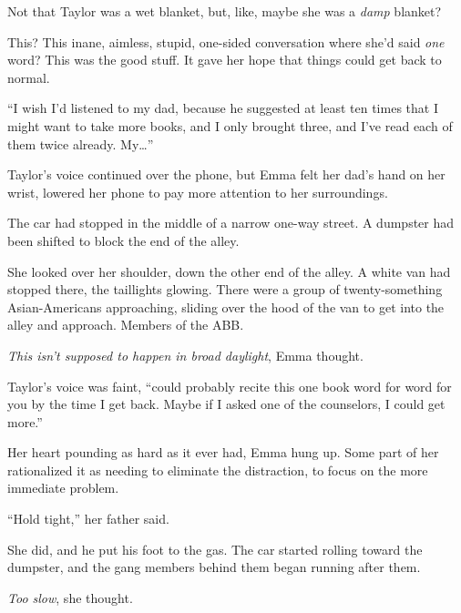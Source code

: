 Not that Taylor was a wet blanket, but, like, maybe she was a \emph{damp} blanket?



This?  This inane, aimless, stupid, one-sided conversation where she'd said\emph{ one} word?  This was the good stuff.  It gave her hope that things could get back to normal.



``\ldotsand I wish I'd listened to my dad, because he suggested at least ten times that I might want to take more books, and I only brought three, and I've read each of them twice already.  My\ldots''



Taylor's voice continued over the phone, but Emma felt her dad's hand on her wrist, lowered her phone to pay more attention to her surroundings.



The car had stopped in the middle of a narrow one-way street.  A dumpster had been shifted to block the end of the alley.



She looked over her shoulder, down the other end of the alley.  A white van had stopped there, the taillights glowing.  There were a group of twenty-something Asian-Americans approaching, sliding over the hood of the van to get into the alley and approach.  Members of the ABB.



\emph{This isn't supposed to happen in broad daylight}, Emma thought.



Taylor's voice was faint, ``\ldotsI could probably recite this one book word for word for you by the time I get back.  Maybe if I asked one of the counselors, I could get more.''



Her heart pounding as hard as it ever had, Emma hung up.  Some part of her rationalized it as needing to eliminate the distraction, to focus on the more immediate problem.



``Hold tight,'' her father said.



She did, and he put his foot to the gas.  The car started rolling toward the dumpster, and the gang members behind them began running after them.



\emph{Too slow}, she thought.



